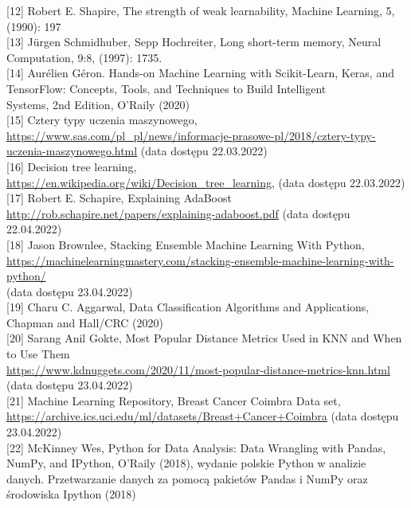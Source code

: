 \documentclass[a4paper,12pt,oneside]{book}
\begin{document}
[12] Robert E. Shapire, The strength of weak learnability, Machine Learning, 5, (1990): 197\\

[13] Jürgen Schmidhuber, Sepp Hochreiter, Long short-term memory, Neural Computation, 9:8, (1997): 1735.\\

[14] Aurélien Géron. Hands-on Machine Learning with Scikit-Learn, Keras, and TensorFlow: Concepts, Tools, and Techniques to Build Intelligent\\ Systems, 2nd Edition, O’Raily (2020)\\

[15] Cztery typy uczenia maszynowego, \url{https://www.sas.com/pl_pl/news/informacje-prasowe-pl/2018/cztery-typy-uczenia-maszynowego.html} (data dostępu 22.03.2022)\\

[16] Decision tree learning, \url{https://en.wikipedia.org/wiki/Decision_tree_learning},  (data dostępu 22.03.2022)\\

[17] Robert E. Schapire, Explaining AdaBoost \url{http://rob.schapire.net/papers/explaining-adaboost.pdf}  (data dostępu 22.04.2022)\\

[18] Jason Brownlee, Stacking Ensemble Machine Learning With Python,\\ 
\url{https://machinelearningmastery.com/stacking-ensemble-machine-learning-with-python/}\\
(data dostępu 23.04.2022)\\

[19] Charu C. Aggarwal, Data Classification Algorithms and Applications, Chapman and Hall/CRC (2020)\\

[20] Sarang Anil Gokte, Most Popular Distance Metrics Used in KNN and When to Use Them\\ \url{https://www.kdnuggets.com/2020/11/most-popular-distance-metrics-knn.html}\\ 
(data dostępu 23.04.2022)\\

[21] Machine Learning Repository, Breast Cancer Coimbra Data set,\\
 \url{https://archive.ics.uci.edu/ml/datasets/Breast+Cancer+Coimbra} (data dostępu 23.04.2022)\\

[22] McKinney Wes, Python for Data Analysis: Data Wrangling with Pandas, NumPy, and IPython, O’Raily (2018), wydanie polskie Python w analizie\\ danych. Przetwarzanie danych za pomocą pakietów Pandas i NumPy oraz środowiska Ipython (2018)\\
\end{document}
